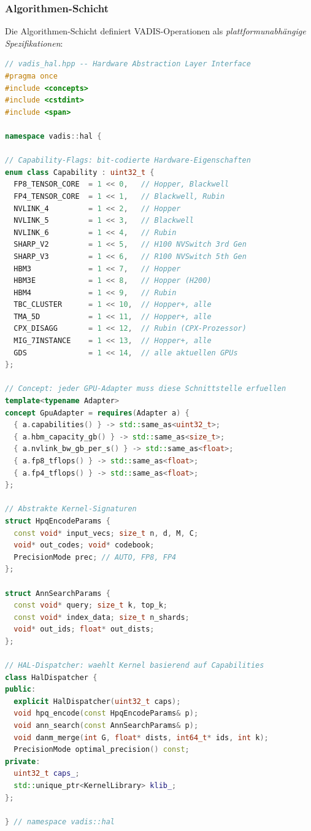﻿\documentclass[12pt,a4paper]{article}
\begin{document}
\subsubsection{Algorithmen-Schicht}

Die Algorithmen-Schicht definiert VADIS-Operationen als
\emph{plattformunabhängige Spezifikationen}:

\begin{lstlisting}[language=C++, caption={VADIS HAL Interface (C++20 Concepts)}]
// vadis_hal.hpp -- Hardware Abstraction Layer Interface
#pragma once
#include <concepts>
#include <cstdint>
#include <span>

namespace vadis::hal {

// Capability-Flags: bit-codierte Hardware-Eigenschaften
enum class Capability : uint32_t {
  FP8_TENSOR_CORE  = 1 << 0,   // Hopper, Blackwell
  FP4_TENSOR_CORE  = 1 << 1,   // Blackwell, Rubin
  NVLINK_4         = 1 << 2,   // Hopper
  NVLINK_5         = 1 << 3,   // Blackwell
  NVLINK_6         = 1 << 4,   // Rubin
  SHARP_V2         = 1 << 5,   // H100 NVSwitch 3rd Gen
  SHARP_V3         = 1 << 6,   // R100 NVSwitch 5th Gen
  HBM3             = 1 << 7,   // Hopper
  HBM3E            = 1 << 8,   // Hopper (H200)
  HBM4             = 1 << 9,   // Rubin
  TBC_CLUSTER      = 1 << 10,  // Hopper+, alle
  TMA_5D           = 1 << 11,  // Hopper+, alle
  CPX_DISAGG       = 1 << 12,  // Rubin (CPX-Prozessor)
  MIG_7INSTANCE    = 1 << 13,  // Hopper+, alle
  GDS              = 1 << 14,  // alle aktuellen GPUs
};

// Concept: jeder GPU-Adapter muss diese Schnittstelle erfuellen
template<typename Adapter>
concept GpuAdapter = requires(Adapter a) {
  { a.capabilities() } -> std::same_as<uint32_t>;
  { a.hbm_capacity_gb() } -> std::same_as<size_t>;
  { a.nvlink_bw_gb_per_s() } -> std::same_as<float>;
  { a.fp8_tflops() } -> std::same_as<float>;
  { a.fp4_tflops() } -> std::same_as<float>;
};

// Abstrakte Kernel-Signaturen
struct HpqEncodeParams {
  const void* input_vecs; size_t n, d, M, C;
  void* out_codes; void* codebook;
  PrecisionMode prec; // AUTO, FP8, FP4
};

struct AnnSearchParams {
  const void* query; size_t k, top_k;
  const void* index_data; size_t n_shards;
  void* out_ids; float* out_dists;
};

// HAL-Dispatcher: waehlt Kernel basierend auf Capabilities
class HalDispatcher {
public:
  explicit HalDispatcher(uint32_t caps);
  void hpq_encode(const HpqEncodeParams& p);
  void ann_search(const AnnSearchParams& p);
  void danm_merge(int G, float* dists, int64_t* ids, int k);
  PrecisionMode optimal_precision() const;
private:
  uint32_t caps_;
  std::unique_ptr<KernelLibrary> klib_;
};

} // namespace vadis::hal
\end{lstlisting}
\end{document}
